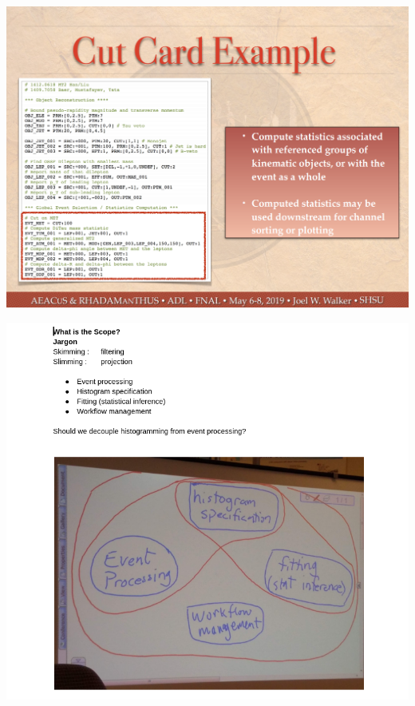 \documentclass[aspectratio=169]{beamer}
\begin{document}
\begin{frame}{}
\vspace{-0.5 cm}
\begin{center}
\includegraphics[height=9.3 cm]{slides-14.png}
\end{center}
\end{frame}

\begin{frame}{}
\vspace{-0.25 cm}
\begin{center}
\includegraphics[height=9.2 cm]{slides-15.png}
\end{center}
\end{frame}
\end{document}
